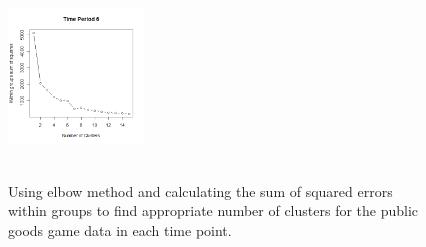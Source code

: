 \begin{figure}[!h]
{\begin{minipage}{\dimexpr \textwidth-2\fboxsep-2\fboxrule}
{                 \includegraphics[width=0.32\textwidth]{images/chapter4/elbowNumberOfClusters6.png}    
             }\\
             
             \\
         \end{minipage}}
         \caption{Using elbow method and calculating the sum of squared errors within groups to find appropriate number of clusters for the public goods game data in each time point.}
         \label{fig:elbowNumberOfClusters}
     \end{figure}
     
